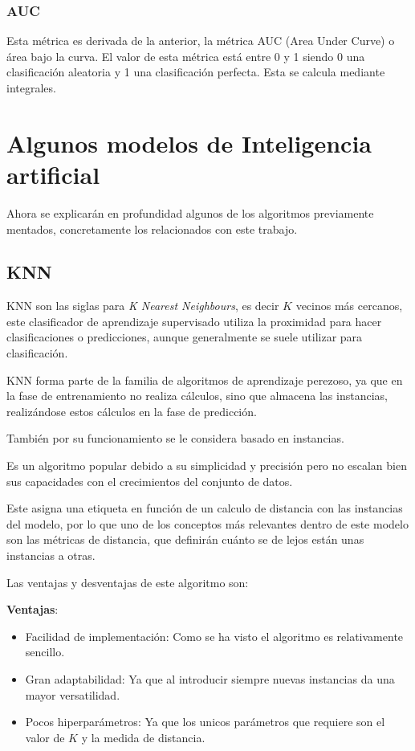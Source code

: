 \subsubsection{AUC}
Esta métrica es derivada de la anterior, la métrica AUC (Area Under Curve) o área bajo la curva. El valor de esta métrica está entre 0 y 1 siendo 0 una clasificación aleatoria y 1 una clasificación perfecta. Esta se calcula mediante integrales.

\section{Algunos modelos de Inteligencia artificial}

Ahora se explicarán en profundidad algunos de los algoritmos previamente mentados, concretamente los relacionados con este trabajo. 

\subsection{KNN}
KNN \cite{ibmQuKNN} son las siglas para \textit{K Nearest Neighbours}, es decir $K$ vecinos más cercanos, este clasificador de aprendizaje supervisado utiliza la proximidad para hacer clasificaciones o predicciones, aunque generalmente se suele utilizar para clasificación. 

KNN forma parte de la familia de algoritmos de aprendizaje perezoso, ya que en la fase de entrenamiento no realiza cálculos, sino que almacena las instancias, realizándose estos cálculos en la fase de predicción.

También por su funcionamiento se le considera basado en instancias.

Es un algoritmo popular debido a su simplicidad y precisión pero no escalan bien sus capacidades con el crecimientos del conjunto de datos.

Este asigna una etiqueta en función de un calculo de distancia con las instancias del modelo, por lo que uno de los conceptos más relevantes dentro de este modelo son las métricas de distancia, que definirán cuánto se de lejos están unas instancias a otras.

Las ventajas y desventajas de este algoritmo son:

\textbf{Ventajas}:

\begin{itemize}
	\item{Facilidad de implementación}: Como se ha visto el algoritmo es relativamente sencillo.
	
	\item{Gran adaptabilidad}: Ya que al introducir siempre nuevas instancias da una mayor versatilidad.
	
	\item{Pocos hiperparámetros}: Ya que los unicos parámetros que requiere son el valor de $K$ y la medida de distancia.
\end{itemize}

